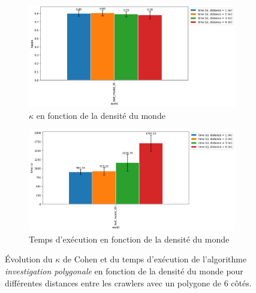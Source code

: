 \documentclass[francais,RandD]{rapportPFE}
\begin{document}
			\begin{figure}[h!]
				\begin{subfigure}[t]{0.9\linewidth}
					\includegraphics[width=\linewidth]{graphics/investigation_polygonale-kappa_vs_world_for_each_d_k1_n2_p6.png}
					\caption{$\kappa$ en fonction de la densité du monde}
					\label{fig:investigation_polygonale-kappa_vs_world_for_each_d_k1_n2_p6}
				\end{subfigure}
				\hfill
				\begin{subfigure}[t]{0.9\linewidth}
						\includegraphics[width=\linewidth]{graphics/investigation_polygonale-time_vs_world_for_each_d_k1_n2_p6.png}
						\caption{Temps d'exécution en fonction de la densité du monde}
						\label{fig:investigation_polygonale-time_vs_world_for_each_d_k1_n2_p6}
				\end{subfigure}
				\caption{Évolution du $\kappa$ de Cohen et du temps d'exécution de l'algorithme \textit{investigation polygonale} en fonction de la densité du monde pour différentes distances entre les crawlers avec un polygone de 6 côtés.}
				\label{fig:investigation_polygonale-world_for_each_d_k1_n2_p6}
			\end{figure}
\end{document}
